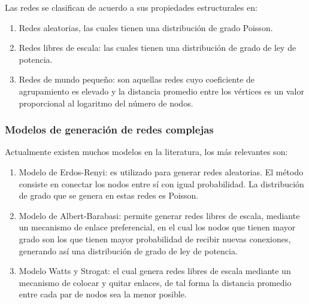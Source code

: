 Las redes se clasifican de acuerdo a sus propiedades estructurales en:

\begin{enumerate}
    \item Redes aleatorias, las cuales tienen una distribución de grado Poisson.
    \item Redes libres de escala: las cuales tienen una distribución de grado de ley de potencia.
    \item Redes de mundo pequeño: son aquellas redes cuyo coeficiente de agrupamiento es elevado y la distancia promedio entre los vértices es un valor proporcional al logaritmo del número de nodos.
\end{enumerate}

\subsubsection{Modelos de generación de redes complejas}

Actualmente existen muchos modelos en la literatura, los más relevantes son:

\begin{enumerate}
    \item Modelo de Erdos-Renyi\cite{Erdos1959}: es utilizado para generar redes aleatorias. El método consiste en conectar los nodos entre sí con igual probabilidad. La distribución de grado que se genera en estas redes es Poisson.
    \item Modelo de Albert-Barabasi\cite{Barabaacutesi1999}: permite generar redes libres de escala, mediante un mecanismo de enlace preferencial, en el cual los nodos que tienen mayor grado son los que tienen mayor probabilidad de recibir nuevas conexiones, generando así una distribución de grado de ley de potencia.
    \item Modelo Watts y Strogat\cite{Watts1998}: el cual genera redes libres de escala mediante un mecanismo de colocar y quitar enlaces, de tal forma la distancia promedio entre cada par de nodos sea la menor posible.
\end{enumerate}


